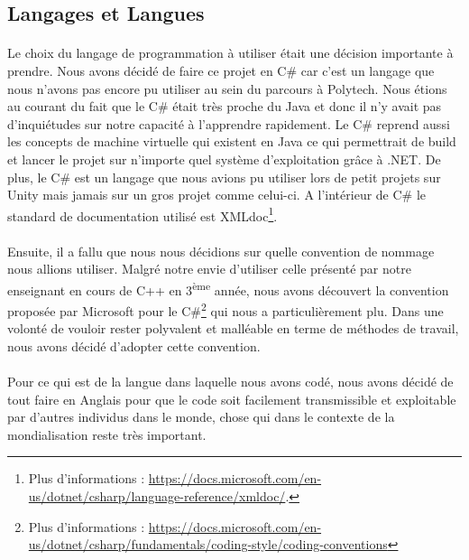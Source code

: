 \documentclass{EPUProjetDi}
\begin{document}
\subsection{Langages et Langues}

\paragraph{}
Le choix du langage de programmation à utiliser était une décision importante à prendre. Nous avons décidé de faire ce projet en C\# car c'est un langage que nous
n'avons pas encore pu utiliser au sein du parcours à Polytech. Nous étions au courant du fait que le C\# était très proche du Java et donc il n'y avait pas
d'inquiétudes sur notre capacité à l'apprendre rapidement. Le C\# reprend aussi les concepts de machine virtuelle qui existent en Java ce qui permettrait de build et lancer le projet
sur n'importe quel système d'exploitation grâce à .NET.
De plus, le C\# est un langage que nous avions pu utiliser lors de petit projets sur Unity mais jamais sur un gros projet comme celui-ci. 
A l'intérieur de C\# le standard de documentation utilisé est XMLdoc\footnote{Plus d'informations : 
\url{https://docs.microsoft.com/en-us/dotnet/csharp/language-reference/xmldoc/}.}.

\paragraph{}
Ensuite, il a fallu que nous nous décidions sur quelle convention de nommage nous allions utiliser. 
Malgré notre envie d'utiliser celle présenté par notre enseignant en cours de C++ en 3\textsuperscript{ème} année, nous avons découvert la convention 
proposée par Microsoft pour le C\#\footnote{Plus d'informations : \url{https://docs.microsoft.com/en-us/dotnet/csharp/fundamentals/coding-style/coding-conventions}} qui nous a particulièrement plu.
Dans une volonté de vouloir rester polyvalent et malléable en terme de méthodes de travail, nous avons décidé d'adopter cette convention.

\paragraph{}
Pour ce qui est de la langue dans laquelle nous avons codé, nous avons décidé de tout faire en Anglais pour que le code soit facilement
transmissible et exploitable par d'autres individus dans le monde, chose qui dans le contexte de la mondialisation reste très important.
\end{document}
